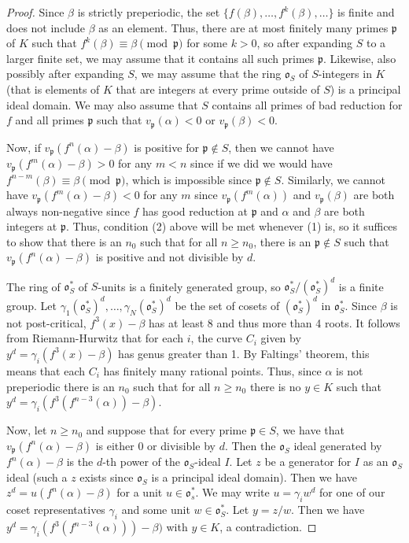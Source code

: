 \documentclass[11pt]{amsart}
\theoremstyle{definition}
\theoremstyle{definition}
\numberwithin{thm}{section}
\numberwithin{equation}{thm}
\newcommand{\fp}{\ensuremath{{\mathfrak{p}}}}
\newcommand{\fo}{\ensuremath{{\mathfrak{o}}}}
\begin{document}
\begin{proof}
  Since $\beta$ is strictly preperiodic, the set $\{ f(\beta), \dots,
  f^k(\beta), \dots \}$ is finite and does not include $\beta$ as an
  element.  Thus, there are at most finitely many primes $\fp$ of $K$
  such that $f^k(\beta) \equiv \beta \pmod {\fp}$ for some $k >
  0$, so after expanding $S$ to a larger finite set, we may assume
  that it contains all such primes $\fp$.  Likewise, also possibly
  after expanding $S$, we may assume that the ring $\fo_S$ of
  $S$-integers in $K$ (that is elements of $K$ that are integers at
  every prime outside of $S$) is a principal ideal domain.  We may
  also assume that $S$ contains all primes of bad reduction for $f$
  and all primes $\fp$ such that $v_\fp(\alpha) < 0$ or $v_\fp(\beta)
  < 0$.  

  Now, if $v_\fp(f^n(\alpha) - \beta)$ is positive  for $\fp
  \notin S$, then we cannot have $v_\fp(f^m(\alpha) - \beta) >
  0$ for any $m < n$ since if we did we would have $f^{n-m}(\beta)
  \equiv \beta \pmod{\fp}$, which is impossible since $\fp \notin
  S$. Similarly, we cannot have $v_\fp(f^m(\alpha) - \beta) <  0$ for
  any $m$ since $v_\fp(f^m(\alpha))$ and $v_\fp(\beta)$ are both always
  non-negative since $f$ has good reduction at $\fp$ and $\alpha$ and
  $\beta$ are both integers at $\fp$.  Thus, condition (2) above will
  be met whenever (1) is, so it suffices to show that there is an
  $n_0$ such that for all $n \geq n_0$, there is an $\fp \notin S$
  such that $v_\fp(f^n(\alpha) - \beta)$ is positive and not
  divisible by $d$.

  The ring of $\fo_S^*$ of $S$-units is a finitely generated group, so
  $\fo_S^* / (\fo_S^*)^d$ is a finite group.  Let
  $\gamma_1(\fo_S^*)^d, \dots, \gamma_N(\fo_S^*)^d$ be
  the set of cosets of $(\fo_S^*)^d$ in $\fo_S^*$.  Since
  $\beta$ is not post-critical, $f^3(x) - \beta$ has at least 8 and
  thus more than 4 roots.  It follows from Riemann-Hurwitz that for
  each $i$, the curve $C_i$ given by $y^d = \gamma_i (f^3(x) - \beta)$
  has genus greater than 1. By Faltings' theorem, this means that each
  $C_i$ has finitely many rational points.  Thus, since $\alpha$ is
  not preperiodic there is an $n_0$ such that for all $n \geq n_0$
  there is no $y \in K$ such that
  $y^d = \gamma_i (f^3(f^{n-3}(\alpha)) - \beta)$.

  Now, let $n \geq n_0$ and suppose that for every prime $\fp \in S$,
  we have that $v_\fp(f^n(\alpha) - \beta)$ is either 0 or divisible
  by $d$.  Then the $\fo_S$ ideal generated by $f^n(\alpha) - \beta$
  is the $d$-th power of the $\fo_S$-ideal $I$.  Let $z$ be a generator
  for $I$ as an $\fo_S$ ideal (such a $z$ exists since $\fo_S$ is a
  principal ideal domain).  Then we have
  $z^d = u (f^n(\alpha) - \beta)$ for a unit $u \in \fo_s^*$.  We may
  write $u = \gamma_i w^d$ for one of our coset representatives
  $\gamma_i$ and some unit $w \in \fo_S^*$.  Let $y = z/w$.  Then we
  have $y^d = \gamma_i (f^3(f^{n-3}(\alpha))) - \beta)$ with $y \in K$,
  a contradiction.


\end{proof}
\end{document}
